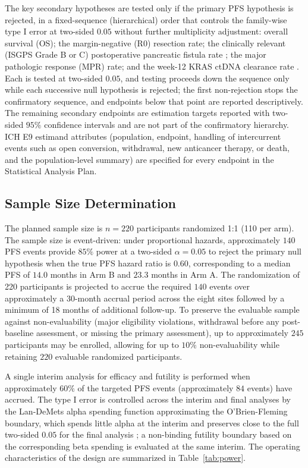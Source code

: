 The key secondary hypotheses are tested only if the primary PFS hypothesis is
rejected, in a fixed-sequence (hierarchical) order that controls the family-wise type
I error at two-sided $0.05$ without further multiplicity adjustment: overall survival
(OS); the margin-negative (R0) resection rate; the clinically relevant (ISGPS Grade B
or C) postoperative pancreatic fistula rate \cite{Bassi2017}; the major pathologic
response (MPR) rate; and the week-12 KRAS ctDNA clearance rate \cite{Tie2019ctdna}.
Each is tested at two-sided $0.05$, and testing proceeds down the sequence only while
each successive null hypothesis is rejected; the first non-rejection stops the
confirmatory sequence, and endpoints below that point are reported descriptively. The
remaining secondary endpoints are estimation targets reported with two-sided $95\%$
confidence intervals and are not part of the confirmatory hierarchy. ICH E9 estimand
attributes (population, endpoint, handling of intercurrent events such as open
conversion, withdrawal, new anticancer therapy, or death, and the population-level
summary) are specified for every endpoint in the Statistical Analysis Plan.

\subsection{Sample Size Determination}

The planned sample size is $n=220$ participants randomized 1:1 (110 per arm). The
sample size is event-driven: under proportional hazards, approximately $140$ PFS
events provide $85\%$ power at a two-sided $\alpha = 0.05$ to reject the primary null
hypothesis when the true PFS hazard ratio is $0.60$, corresponding to a median PFS of
$14.0$ months in Arm B and $23.3$ months in Arm A. The randomization of 220
participants is projected to accrue the required $140$ events over approximately a
30-month accrual period across the eight sites followed by a minimum of 18 months of
additional follow-up. To preserve the evaluable sample against non-evaluability
(major eligibility violations, withdrawal before any post-baseline assessment, or
missing the primary assessment), up to approximately $245$ participants may be
enrolled, allowing for up to $10\%$ non-evaluability while retaining $220$ evaluable
randomized participants.

A single interim analysis for efficacy and futility is performed when approximately
$60\%$ of the targeted PFS events (approximately $84$ events) have accrued. The type
I error is controlled across the interim and final analyses by the Lan-DeMets alpha
spending function approximating the O'Brien-Fleming boundary, which spends little
alpha at the interim and preserves close to the full two-sided $0.05$ for the final
analysis \cite{DeMets1994lan,Jennison2000group}; a non-binding futility boundary
based on the corresponding beta spending is evaluated at the same interim. The
operating characteristics of the design are summarized in Table~\ref{tab:power}.

